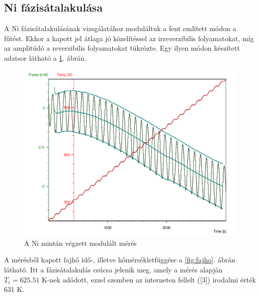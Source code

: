 \documentclass[12pt,a4paper]{article}
\begin{document}
\subsection{Ni fázisátalakulása}
\hspace*{10pt} A Ni fázisátalakulásának vizsgálatához moduláltuk a fent említett módon a fűtést. Ekkor a kapott jel átlaga jó közelítéssel az irreverzibilis folyamatokat, míg az amplitúdó a reverzibilis folyamatokat tükrözte. Egy ilyen módon készített adatsor látható a \ref{fig:ni}. ábrán.\\
\begin{figure}[!h]
\centering
\includegraphics[width=0.7\linewidth]{13fin}
\caption{A Ni mintán végzett modulált mérés}
\label{fig:ni}
\end{figure}


\hspace*{10pt} A mérésből kapott fajhő idő-, illetve hőmérsékletfüggése a \ref{fig:fajho}. ábrán látható. Itt a fázisátalakulás csúcsa jelenik meg, amely a mérés alapján $T_c = 625.51$ K-nek adódott, ezzel szemben az interneten fellelt ([3]) irodalmi érték 631 K.
\end{document}
